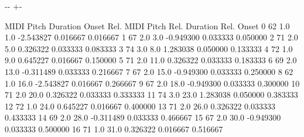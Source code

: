 \documentclass[letterpaper,10pt,english]{sphinxmanual}
\newlength\nbsphinxcodecellspacing
\begin{document}
{
\begin{sphinxVerbatim}[commandchars=\\\{\}]
\llap{\color{nbsphinxin}[46]:\,\hspace{\fboxrule}\hspace{\fboxsep}}
\end{sphinxVerbatim}
}

{

\kern-\sphinxverbatimsmallskipamount\kern-\baselineskip
\kern+\FrameHeightAdjust\kern-\fboxrule
\vspace{\nbsphinxcodecellspacing}

\begin{sphinxVerbatim}[commandchars=\\\{\}]
\llap{\color{nbsphinxout}[46]:\,\hspace{\fboxrule}\hspace{\fboxsep}}    MIDI Pitch  Duration  Onset  Rel. MIDI Pitch  Rel. Duration  Rel. Onset
0           62       1.0    1.0        -2.543827       0.016667    0.016667
1           67       2.0    3.0        -0.949300       0.033333    0.050000
2           71       2.0    5.0         0.326322       0.033333    0.083333
3           74       3.0    8.0         1.283038       0.050000    0.133333
4           72       1.0    9.0         0.645227       0.016667    0.150000
5           71       2.0   11.0         0.326322       0.033333    0.183333
6           69       2.0   13.0        -0.311489       0.033333    0.216667
7           67       2.0   15.0        -0.949300       0.033333    0.250000
8           62       1.0   16.0        -2.543827       0.016667    0.266667
9           67       2.0   18.0        -0.949300       0.033333    0.300000
10          71       2.0   20.0         0.326322       0.033333    0.333333
11          74       3.0   23.0         1.283038       0.050000    0.383333
12          72       1.0   24.0         0.645227       0.016667    0.400000
13          71       2.0   26.0         0.326322       0.033333    0.433333
14          69       2.0   28.0        -0.311489       0.033333    0.466667
15          67       2.0   30.0        -0.949300       0.033333    0.500000
16          71       1.0   31.0         0.326322       0.016667    0.516667

\end{sphinxVerbatim}}
\end{document}
